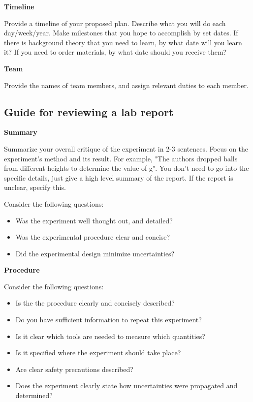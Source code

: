 \textbf{Timeline}

Provide a timeline of your proposed plan. Describe what you will do each day/week/year. Make milestones that you hope to accomplish by set dates. If there is background theory that you need to learn, by what date will you learn it? If you need to order materials, by what date should you receive them?

\textbf{Team}

Provide the names of team members, and assign relevant duties to each member. 

\newpage
\subsection{Guide for reviewing a lab report}
 \vspace{0.25cm}
\textbf{Summary}

Summarize your overall critique of the experiment in 2-3 sentences. Focus on the experiment's method and its result. For example, "The authors dropped balls from different heights to determine the value of g". You don't need to go into the specific details, just give a high level summary of the report. If the report is unclear, specify this.

Consider the following questions:
\begin{itemize}
\item Was the experiment well thought out, and detailed?
\item Was the experimental procedure clear and concise?
\item Did the experimental design minimize uncertainties?
\end{itemize}


\textbf{Procedure}

Consider the following questions:
\begin{itemize}
\item Is the the procedure clearly and concisely described? 
\item Do you have sufficient information to repeat this experiment?
\item Is it clear which tools are needed to measure which quantities?
\item Is it specified where the experiment should take place?
\item Are clear safety precautions described?
\item Does the experiment clearly state how uncertainties were propagated and determined?
\end{itemize}

